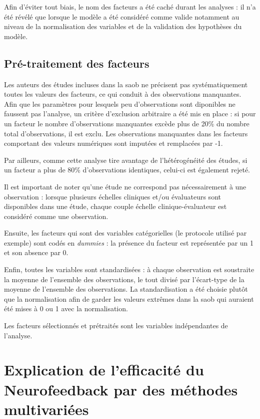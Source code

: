 Afin d'éviter tout biais, le nom des facteurs a été caché durant les analyses : il n'a été révélé que lorsque le modèle a été considéré comme valide notamment au niveau 
de la normalisation des variables et de la validation des hypothèses du modèle.  

\subsection{Pré-traitement des facteurs}

Les auteurs des études incluses dans la \gls{saob} ne précisent pas systématiquement toutes les valeurs des facteurs, ce qui conduit à des observations manquantes. Afin que 
les paramètres pour lesquels peu d'observations sont diponibles ne faussent pas l'analyse, un critère d'exclusion arbitraire a été mis en place : si pour un facteur le nombre d'observations 
manquantes excède plus de 20\% du nombre total d'observations, il est exclu. Les observations manquantes dans les facteurs comportant des valeurs numériques sont 
imputées et remplacées par -1.

Par ailleurs, comme cette analyse tire avantage de l'hétérogénéité des études, si un facteur a plus de 80\% d'observations identiques, 
celui-ci est également rejeté. 

Il est important de noter qu'une étude ne correspond pas nécessairement à une observation : lorsque plusieurs échelles cliniques et/ou évaluateurs sont disponibles dans une étude,
chaque couple échelle clinique-évaluateur est considéré comme une observation.

Ensuite, les facteurs qui sont des variables catégorielles (le protocole utilisé par exemple) sont codés en \textit{dummies} : la présence du facteur est représentée par un 1 et son absence par 0. 

Enfin, toutes les variables sont standardisées : à chaque observation est soustraite la moyenne de l'ensemble des observations, le tout divisé par l'écart-type de la moyenne de 
l'ensemble des observations. La standardisation a été choisie plutôt que la normalisation afin de garder les valeurs extrêmes dans la \gls{saob} qui auraient été mises à 0 ou 1 avec 
la normalisation. 

Les facteurs sélectionnés et prétraités sont les variables indépendantes de l'analyse.


\section{Explication de l'efficacité du Neurofeedback par des méthodes multivariées}

